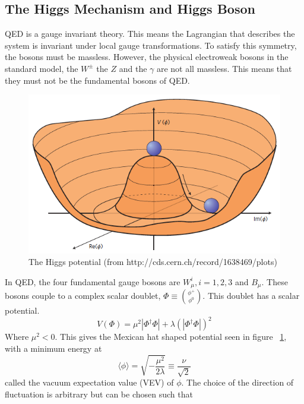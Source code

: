 \subsection{The Higgs Mechanism and Higgs Boson}
\label{ssec:Higgs}
QED is a gauge invariant theory. This means the Lagrangian that describes the system is invariant under local gauge transformations. To satisfy this symmetry, the bosons must be massless. However, the physical electroweak bosons in the standard model, the ${W^{\pm}}$ the ${Z}$ and the ${\gamma}$ are not all massless. This means that they must not be the fundamental bosons of QED.\newline

\begin{figure}[h]
\begin{center}
\includegraphics[scale=0.65]{figures/higgspotential}
\caption{The Higgs potential (from http://cds.cern.ch/record/1638469/plots) }
\label{Fig:higgspot}
\end{center}
\end{figure}

\indent In QED, the four fundamental gauge bosons are ${W^{i}_{\mu}, i = 1,2,3}$ and ${B_{\mu}}$. These bosons couple to a complex scalar doublet, ${\Phi \equiv \binom{\phi^{+}}{\phi^{0}}}$. This doublet has a scalar potential.
\begin{equation}
\label{eq:higgsPot}
V(\Phi) = \mu^{2}|\Phi^{\dagger}\Phi| + \lambda(|\Phi^{\dagger}\Phi|)^{2}
\end{equation}
Where ${\mu^{2} < 0}$. This gives the Mexican hat shaped potential seen in figure ~\ref{Fig:higgspot}, with a minimum energy at 
\begin{equation}
\langle \phi \rangle = \sqrt{-\frac{\mu^{2}}{2\lambda}}\equiv \frac{\nu}{\sqrt{2}}
\end{equation}
called the vacuum expectation value (VEV) of ${\phi}$. The choice of the direction of fluctuation is arbitrary but can be chosen such that


